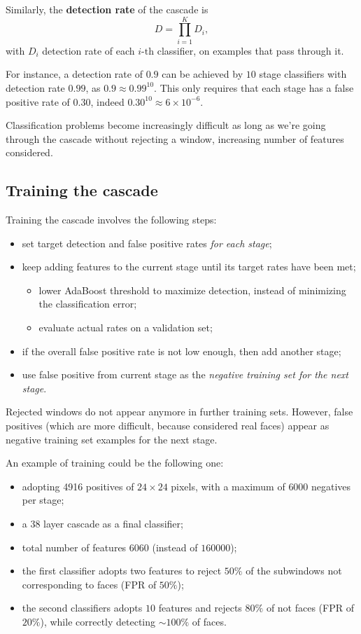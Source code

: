 \documentclass[10pt]{report}
\begin{document}
Similarly, the \textbf{detection rate} of the cascade is $$D = \prod_{i=1}^K D_i,$$ with \(D_i\) detection rate of each \(i\mbox{-th}\) classifier, on examples that pass through it.

For instance, a detection rate of \(0.9\) can be achieved by \(10\) stage classifiers with detection rate \(0.99\), as \(0.9 \approx 0.99^{10}\). This only requires that each stage has a false positive rate of \(0.30\), indeed \(0.30^{10} \approx 6 \times 10^{-6}\).

Classification problems become increasingly difficult as long as we're going through the cascade without rejecting a window, increasing number of features considered.

\subsection{Training the cascade}
\label{sec:org8e195c9}

Training the cascade involves the following steps:
\begin{itemize}
\item set target detection and false positive rates \emph{for each stage};
\item keep adding features to the current stage until its target rates have been met;
\begin{itemize}
\item lower AdaBoost threshold to maximize detection, instead of minimizing the classification error;
\item evaluate actual rates on a validation set;
\end{itemize}
\item if the overall false positive rate is not low enough, then add another stage;
\item use false positive from current stage as the \emph{negative training set for the next stage}.
\end{itemize}

Rejected windows do not appear anymore in further training sets. However, false positives (which are more difficult, because considered real faces) appear as negative training set examples for the next stage.

An example of training could be the following one:
\begin{itemize}
\item adopting 4916 positives of \(24 \times 24\) pixels, with a maximum of \(6000\) negatives per stage;
\item a 38 layer cascade as a final classifier;
\item total number of features \(6060\) (instead of \(160000\));
\item the first classifier adopts two features to reject \(50\%\) of the subwindows not corresponding to faces (FPR of \(50\%\));
\item the second classifiers adopts \(10\) features and rejects \(80\%\) of not faces (FPR of \(20\%\)), while correctly detecting \(\sim100\%\) of faces.
\end{itemize}
\end{document}
